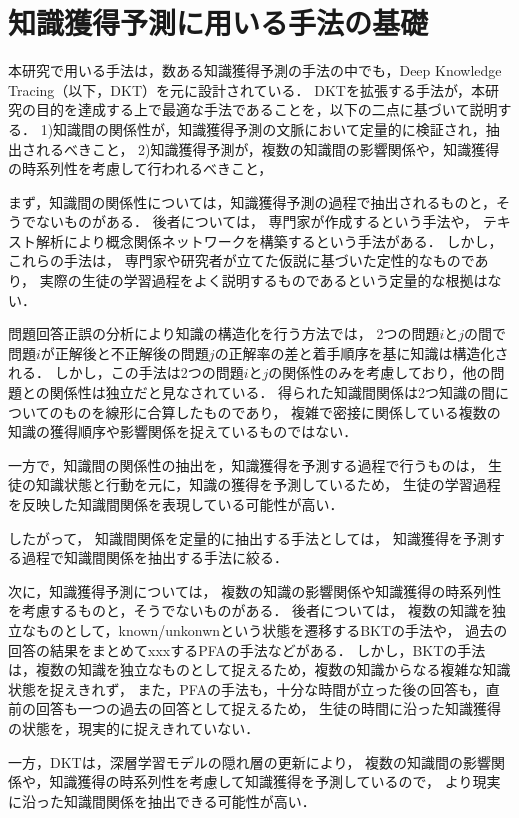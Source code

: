 \section{知識獲得予測に用いる手法の基礎}
本研究で用いる手法は，数ある知識獲得予測の手法の中でも，Deep Knowledge Tracing（以下，DKT）を元に設計されている．
DKTを拡張する手法が，本研究の目的を達成する上で最適な手法であることを，以下の二点に基づいて説明する．
1)知識間の関係性が，知識獲得予測の文脈において定量的に検証され，抽出されるべきこと，
2)知識獲得予測が，複数の知識間の影響関係や，知識獲得の時系列性を考慮して行われるべきこと，


まず，知識間の関係性については，知識獲得予測の過程で抽出されるものと，そうでないものがある．
後者については，
専門家が作成するという手法や，
テキスト解析により概念関係ネットワークを構築するという手法\cite{chen2008mining}がある．
しかし，これらの手法は，
専門家や研究者が立てた仮説に基づいた定性的なものであり，
実際の生徒の学習過程をよく説明するものであるという定量的な根拠はない．

問題回答正誤の分析により知識の構造化を行う方法では，
2つの問題$i$と$j$の間で問題$i$が正解後と不正解後の問題$j$の正解率の差と着手順序を基に知識は構造化される．
しかし，この手法は2つの問題$i$と$j$の関係性のみを考慮しており，他の問題との関係性は独立だと見なされている．
得られた知識間関係は2つ知識の間についてのものを線形に合算したものであり，
複雑で密接に関係している複数の知識の獲得順序や影響関係を捉えているものではない．

一方で，知識間の関係性の抽出を，知識獲得を予測する過程で行うものは，
生徒の知識状態と行動を元に，知識の獲得を予測しているため，
生徒の学習過程を反映した知識間関係を表現している可能性が高い．

したがって，
知識間関係を定量的に抽出する手法としては，
知識獲得を予測する過程で知識間関係を抽出する手法に絞る．


次に，知識獲得予測については，
複数の知識の影響関係や知識獲得の時系列性を考慮するものと，そうでないものがある．
後者については，
複数の知識を独立なものとして，known/unkonwnという状態を遷移するBKTの手法や，
過去の回答の結果をまとめてxxxするPFAの手法などがある．
しかし，BKTの手法は，複数の知識を独立なものとして捉えるため，複数の知識からなる複雑な知識状態を捉えきれず，
また，PFAの手法も，十分な時間が立った後の回答も，直前の回答も一つの過去の回答として捉えるため，
生徒の時間に沿った知識獲得の状態を，現実的に捉えきれていない．

一方，DKTは，深層学習モデルの隠れ層の更新により，
複数の知識間の影響関係や，知識獲得の時系列性を考慮して知識獲得を予測しているので，
より現実に沿った知識間関係を抽出できる可能性が高い．

